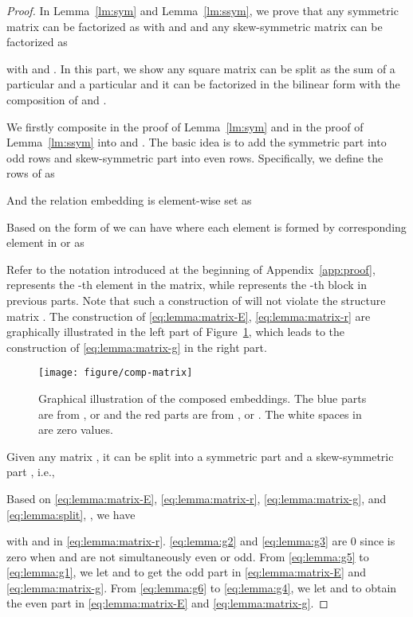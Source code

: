 \documentclass[10pt,journal,compsoc]{IEEEtran}
\begin{document}
\begin{proof}
In Lemma~\ref{lm:sym} and Lemma~\ref{lm:ssym},
we prove that any symmetric matrix can be factorized as   
with  and  
and any skew-symmetric matrix can be factorized as  

with
 and  .
In this part,
we show any square matrix 
can be split as the sum of a particular  and a particular 
and it can be factorized
in the bilinear form with the composition of  and .

We firstly composite
 in the proof of Lemma~\ref{lm:sym}
and 
 in the proof of Lemma~\ref{lm:ssym}
into
 and  .
The basic idea is to add the symmetric part into odd rows and skew-symmetric part into even rows.
Specifically,
we define the rows of 
 as

And the relation embedding  is element-wise set as

Based on the form of 
we can have 
where each element is formed by corresponding element in 
or  as

Refer to the notation introduced at the beginning of Appendix~\ref{app:proof}, 
 represents the -th element in the matrix,
while  represents the -th block in previous parts.
Note that
such a construction of  will not violate the structure matrix .
The construction of \eqref{eq:lemma:matrix-E}, \eqref{eq:lemma:matrix-r} 
are graphically illustrated in the left part of Figure~\ref{fig:comp-matrix},
which leads to the construction of \eqref{eq:lemma:matrix-g} in the right part.

\begin{figure}[ht]
	\centering
	\texttt{[image: figure/comp-matrix]}
		\vspace{-5px}
	\caption{Graphical illustration of the composed embeddings. The blue parts are from ,  or  and the red parts are from ,  or . The white spaces in  are zero values.}
	\label{fig:comp-matrix}
\end{figure}

Given any matrix ,
it can be split into a symmetric part  and a skew-symmetric part ,
i.e.,

Based on 
\eqref{eq:lemma:matrix-E},
\eqref{eq:lemma:matrix-r},
\eqref{eq:lemma:matrix-g},
and \eqref{eq:lemma:split},
,
we have 

with  and  in \eqref{eq:lemma:matrix-r}.
\eqref{eq:lemma:g2} and \eqref{eq:lemma:g3} are 0 since  is zero when  and  are not simultaneously even or odd.
From \eqref{eq:lemma:g5} to \eqref{eq:lemma:g1}, we let  and 
to get the odd part in \eqref{eq:lemma:matrix-E} and \eqref{eq:lemma:matrix-g}.
From \eqref{eq:lemma:g6} to \eqref{eq:lemma:g4}, we let  and 
to obtain the even part in \eqref{eq:lemma:matrix-E} and \eqref{eq:lemma:matrix-g}.
\end{proof}	
\end{document}
